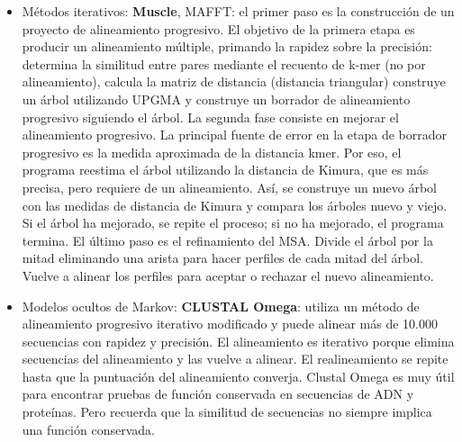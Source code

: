 \begin{itemize}
\begin{itemize}
\item Métodos iterativos: \textbf{Muscle}, MAFFT: el primer paso es la construcción de un proyecto de alineamiento progresivo. El objetivo de la primera etapa es producir un alineamiento múltiple, primando la rapidez sobre la precisión: determina la similitud entre pares mediante el recuento de k-mer (no por alineamiento), calcula la matriz de distancia (distancia triangular) construye un árbol utilizando UPGMA y construye un borrador de alineamiento progresivo siguiendo el árbol. La segunda fase consiste en mejorar el alineamiento progresivo. La principal fuente de error en la etapa de borrador progresivo es la medida aproximada de la distancia kmer. Por eso, el programa reestima el árbol utilizando la distancia de Kimura, que es más precisa, pero requiere de un alineamiento. Así, se construye un nuevo árbol con las medidas de distancia de Kimura y compara los árboles nuevo y viejo. Si el árbol ha mejorado, se repite el proceso; si no ha mejorado, el programa termina. El último paso es el refinamiento del MSA. Divide el árbol por la mitad eliminando una arista para hacer perfiles de cada mitad del árbol. Vuelve a alinear los perfiles para aceptar o rechazar el nuevo alineamiento.

\item Modelos ocultos de Markov: \textbf{CLUSTAL Omega}: utiliza un método de alineamiento progresivo iterativo modificado y puede alinear más de 10.000 secuencias con rapidez y precisión. El alineamiento es iterativo porque elimina secuencias del alineamiento y las vuelve a alinear. El realineamiento se repite hasta que la puntuación del alineamiento converja. Clustal Omega es muy útil para encontrar pruebas de función conservada en secuencias de ADN y proteínas. Pero recuerda que la similitud de secuencias no siempre implica una función conservada.
\end{itemize}
\end{itemize}


